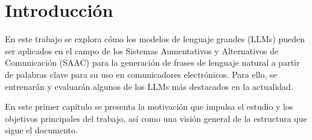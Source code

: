 \documentclass[11pt,spanish,listoffigures,listoftables]{tfgetsinf}
\begin{document}
\begin{abstract}[english]
Augmentative and Alternative Communication (AAC) systems are vital tools for facilitating communication for individuals with difficulties using language. These systems allow users to select pictograms associated with key words that will form the sentence that is wished to communicate. Then, the sentence can be synthesized with a human voice. Recent advances in the field of natural language processing, and specifically the proliferation of large language models, offer new perspectives for improving AAC systems. In particular, this work will explore how these language models can enhance the expressiveness of AAC communication when used to generate natural language from the key words (pictograms) selected by the user. In this way, this work will evaluate the performance of these models when adapted for integration into AAC systems. This evaluation will be carried out using real test sets in spanish and english extracted from the portal of the Aragonese Center for Augmentative and Alternative Communication.
\end{abstract}


\mainmatter


\chapter{Introducción} \label{cap1}

En este trabajo se explora cómo los modelos de lenguaje grandes (LLMs) pueden ser aplicados en el campo de los Sistemas Aumentativos y Alternativos de Comunicación (SAAC) para la generación de frases de lenguaje natural a partir de palabras clave para su uso en comunicadores electrónicos. Para ello, se entrenarán y evaluarán algunos de los LLMs más destacados en la actualidad.

En este primer capítulo se presenta la motivación que impulsa el estudio y los objetivos principales del trabajo, así como una visión general de la estructura que sigue el documento.
\end{document}
